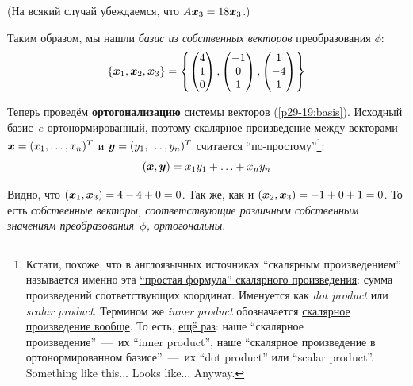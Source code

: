 \documentclass[a4paper,12pt]{article}
\theoremstyle{remark}
\begin{document}
\begin{solution}
  (На всякий случай убеждаемся, что $A \boldsymbol x_3 = 18 \boldsymbol x_3$.)
  
  \medskip
  
  Таким образом, мы нашли \emph{базис из собственных векторов} преобразования $\phi$:
  \begin{equation}\label{p29-19:basis}
    \{\boldsymbol x_1, \boldsymbol x_2, \boldsymbol x_3\} = \left\{
      \begin{pmatrix}
        4 \\ 1 \\ 0
      \end{pmatrix},
      \begin{pmatrix}
        -1 \\ 0 \\ 1
      \end{pmatrix},
      \begin{pmatrix}
        1 \\ -4 \\ 1
      \end{pmatrix}
    \right\}
  \end{equation}
  
  \medskip
  
  Теперь проведём \textbf{ортогонализацию} системы векторов (\ref{p29-19:basis}).
  Исходный базис~$e$ ортонормированный, поэтому скалярное произведение между векторами $\bds x \hm= (x_1, \ldots, x_n)^T$ и $\bds y \hm= (y_1, \ldots, y_n)^T$ считается ``по-простому''\footnote{Кстати, похоже, что в англоязычных источниках ``скалярным произведением'' называется именно эта \href{https://en.wikipedia.org/wiki/Dot_product\#Coordinate\_definition}{``простая формула'' скалярного произведения}: сумма произведений соответствующих координат. Именуется как \emph{dot product} или \emph{scalar product}. Термином же \emph{inner product} обозначается \href{https://en.wikipedia.org/wiki/Inner\_product\_space}{скалярное произведение вообще}. То есть, \href{https://math.stackexchange.com/a/476742/451127}{ещё раз}: наше ``скалярное произведение''~---~их ``inner product'', наше ``скалярное произведение в ортонормированном базисе''~---~их ``dot product'' или ``scalar product''. Something like this... Looks like... Anyway.}:
  \[
    (\boldsymbol x, \boldsymbol y) = x_1 y_1 + \ldots + x_n y_n
  \]
  
  Видно, что $(\bds x_1, \bds x_3) \hm= 4 \hm- 4 \hm+ 0 \hm= 0$.
  Так же, как и $(\bds x_2, \bds x_3) \hm= -1 \hm+ 0 \hm+ 1 \hm= 0$.
  То есть \emph{собственные векторы, соответствующие различным собственным значениям преобразования~$\phi$, ортогональны}.
  

\end{solution}
\end{document}
